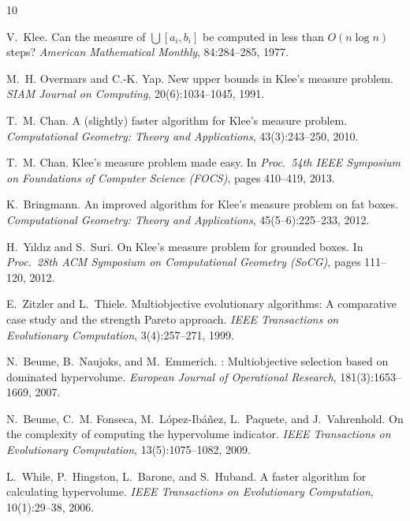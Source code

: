 \documentclass[11pt,a4paper]{article}
\theoremstyle{remark}
\begin{document}
\begin{thebibliography}{10}\setlength{\itemsep}{2pt}

V.~Klee.
\newblock Can the measure of $\bigcup[a_i,b_i]$ be computed in less than
  $O(n\log n)$ steps?
\newblock \emph{American Mathematical Monthly}, 84:284--285, 1977.

M.~H. Overmars and C.-K. Yap.
\newblock New upper bounds in Klee's measure problem.
\newblock \emph{SIAM Journal on Computing}, 20(6):1034--1045, 1991.

T.~M. Chan.
\newblock A (slightly) faster algorithm for Klee's measure problem.
\newblock \emph{Computational Geometry: Theory and Applications},
  43(3):243--250, 2010.

T.~M. Chan.
\newblock Klee's measure problem made easy.
\newblock In \emph{Proc.\ 54th IEEE Symposium on Foundations of Computer
  Science (FOCS)}, pages 410--419, 2013.

K.~Bringmann.
\newblock An improved algorithm for Klee's measure problem on fat boxes.
\newblock \emph{Computational Geometry: Theory and Applications},
  45(5--6):225--233, 2012.

H.~Y{\i}ld{\i}z and S.~Suri.
\newblock On Klee's measure problem for grounded boxes.
\newblock In \emph{Proc.\ 28th ACM Symposium on Computational Geometry
  (SoCG)}, pages 111--120, 2012.

E.~Zitzler and L.~Thiele.
\newblock Multiobjective evolutionary algorithms: A comparative case study
  and the strength {P}areto approach.
\newblock \emph{IEEE Transactions on Evolutionary Computation},
  3(4):257--271, 1999.

N.~Beume, B.~Naujoks, and M.~Emmerich.
: Multiobjective selection based on dominated
  hypervolume.
\newblock \emph{European Journal of Operational Research},
  181(3):1653--1669, 2007.

N.~Beume, C.~M. Fonseca, M.~L{\'o}pez-Ib{\'a}{\~n}ez, L.~Paquete, and
  J.~Vahrenhold.
\newblock On the complexity of computing the hypervolume indicator.
\newblock \emph{IEEE Transactions on Evolutionary Computation},
  13(5):1075--1082, 2009.

L.~While, P.~Hingston, L.~Barone, and S.~Huband.
\newblock A faster algorithm for calculating hypervolume.
\newblock \emph{IEEE Transactions on Evolutionary Computation},
  10(1):29--38, 2006.


\end{thebibliography}
\end{document}
